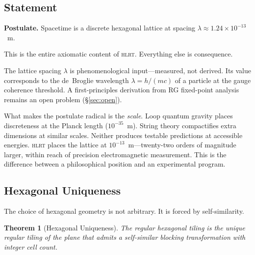 \documentclass[12pt,a4paper]{article}
\theoremstyle{plain}
\newtheorem{theorem}{Theorem}[section]
\theoremstyle{definition}
\newcommand{\HLRT}{\textsc{hlrt}}
\begin{document}
\subsection{Statement}

\begin{tcolorbox}[colback=blue!3!white, colframe=blue!50!black]
\textbf{Postulate.} Spacetime is a discrete hexagonal lattice at spacing $\lambda \approx 1.24 \times 10^{-13}$~m.
\end{tcolorbox}

This is the entire axiomatic content of \HLRT{}. Everything else is consequence.

The lattice spacing $\lambda$ is phenomenological input---measured, not derived. Its value corresponds to the de~Broglie wavelength $\lambda = h/(mc)$ of a particle at the gauge coherence threshold. A first-principles derivation from RG fixed-point analysis remains an open problem (\S\ref{sec:open}).

What makes the postulate radical is the \emph{scale}. Loop quantum gravity places discreteness at the Planck length ($10^{-35}$~m). String theory compactifies extra dimensions at similar scales. Neither produces testable predictions at accessible energies. \HLRT{} places the lattice at $10^{-13}$~m---twenty-two orders of magnitude larger, within reach of precision electromagnetic measurement. This is the difference between a philosophical position and an experimental program.

\subsection{Hexagonal Uniqueness}\label{sec:hex-unique}

The choice of hexagonal geometry is not arbitrary. It is forced by self-similarity.

\begin{theorem}[Hexagonal Uniqueness]\label{thm:hex-unique}
The regular hexagonal tiling is the unique regular tiling of the plane that admits a self-similar blocking transformation with integer cell count.
\end{theorem}
\end{document}
